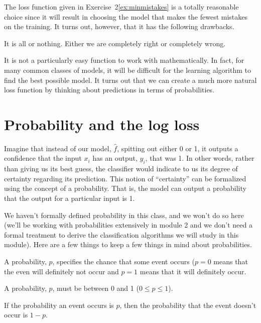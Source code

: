 \documentclass[assignment03_Solutions]{subfiles}
\begin{document}
The loss function given in Exercise~2\ref{ex:minmistakes} is a totally reasonable choice since it will result in choosing the model that makes the fewest mistakes on the training.  It turns out, however, that it has the following drawbacks.
\bi
\item It is all or nothing.  Either we are completely right or completely wrong.
\item It is not a particularly easy function to work with mathematically.  In fact, for many common classes of models, it will be difficult for the learning algorithm to find the best possible model.
\ei
It turns out that we can create a much more natural loss function by thinking about predictions in terms of probabilities.

\section{Probability and the log loss}
Imagine that instead of our model, $\hat{f}$, spitting out either 0 or 1, it outputs a confidence that the input $x_i$ has an output, $y_i$, that was 1.  In other words, rather than giving us its best guess, the classifier would indicate to us its degree of certainty regarding its prediction.  This notion of ``certainty'' can be formalized using the concept of a probability.  That is, the model can output a probability that the output for a particular input is 1.

We haven't formally defined probability in this class, and we won't do so here (we'll be working with probabilities extensively in module 2 and we don't need a formal treatment to derive the classification algorithms we will study in this module).  Here are a few things to keep a few things in mind about probabilities.
\bi
\item A probability, $p$, specifies the chance that some event occurs ($p = 0$ means that the even will definitely not occur and $p=1$ means that it will definitely occur.
\item A probability, $p$, must be between 0 and 1 ($0 \leq p \leq 1$).
\item If the probability an event occurs is $p$, then the probability that the event doesn't occur is $1 - p$.
\ei
\end{document}
